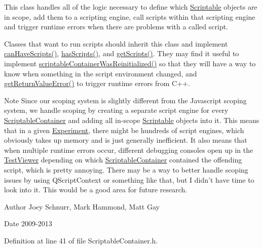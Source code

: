 This class handles all of the logic necessary to define which \hyperlink{class_picto_1_1_scriptable}{Scriptable} objects are in scope, add them to a scripting engine, call scripts within that scripting engine and trigger runtime errors when there are problems with a called script.

Classes that want to run scripts should inherit this class and implement \hyperlink{class_picto_1_1_scriptable_container_a1dd4cb7038c3775ca19071bec78b3b1b}{can\-Have\-Scripts()}, \hyperlink{class_picto_1_1_scriptable_container_acb933156df40af1820e623fa92d051a4}{has\-Scripts()}, and \hyperlink{class_picto_1_1_scriptable_container_a6476dc86309bfa82d6b02b04e7dba4cf}{get\-Scripts()}. They may find it useful to implement \hyperlink{class_picto_1_1_scriptable_container_acabb0f86283aefd4e247f076b56504cd}{scriptable\-Container\-Was\-Reinitialized()} so that they will have a way to know when something in the script environment changed, and \hyperlink{class_picto_1_1_scriptable_container_a1e0264aee7ce551d450dc07a6b369d56}{get\-Return\-Value\-Error()} to trigger runtime errors from C++.

\begin{DoxyNote}{Note}
Since our scoping system is slightly different from the Javascript scoping system, we handle scoping by creating a separate script engine for every \hyperlink{class_picto_1_1_scriptable_container}{Scriptable\-Container} and adding all in-\/scope \hyperlink{class_picto_1_1_scriptable}{Scriptable} objects into it. This means that in a given \hyperlink{class_picto_1_1_experiment}{Experiment}, there might be hundreds of script engines, which obviously takes up memory and is just generally inefficient. It also means that when multiple runtime errors occur, different debugging consoles open up in the \hyperlink{class_test_viewer}{Test\-Viewer} depending on which \hyperlink{class_picto_1_1_scriptable_container}{Scriptable\-Container} contained the offending script, which is pretty annoying. There may be a way to better handle scoping issues by using Q\-Script\-Context or something like that, but I didn't have time to look into it. This would be a good area for future research. 
\end{DoxyNote}
\begin{DoxyAuthor}{Author}
Joey Schnurr, Mark Hammond, Matt Gay 
\end{DoxyAuthor}
\begin{DoxyDate}{Date}
2009-\/2013 
\end{DoxyDate}


Definition at line 41 of file Scriptable\-Container.\-h.



